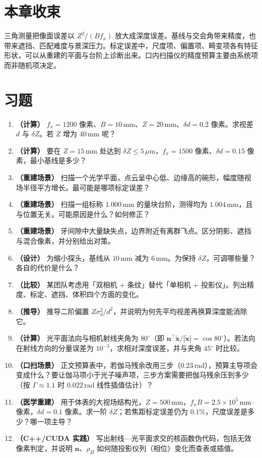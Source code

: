 \section*{本章收束}
三角测量把像面误差以 $Z^2/(Bf_x)$ 放大成深度误差。基线与交会角带来精度，也带来遮挡、匹配难度与景深压力。标定误差中，尺度项、偏置项、畸变项各有特征形状，可以从重建的平面与台阶上诊断出来。口内扫描仪的精度预算主要由系统项而非随机项决定。

\section{习题}
\label{sec:ch07-exercises}

\begin{enumerate}
  \item \textbf{（计算）} $f_x=1200$ 像素、$B=10\,\mathrm{mm}$、$Z=20\,\mathrm{mm}$、$\delta d=0.2$ 像素。求视差 $d$ 与 $\delta Z$。若 $Z$ 增为 $40\,\mathrm{mm}$ 呢？
  \item \textbf{（计算）} 要在 $Z=15\,\mathrm{mm}$ 处达到 $\delta Z\le5\,\mu\mathrm{m}$，$f_x=1500$ 像素、$\delta d=0.15$ 像素，最小基线是多少？
  \item \textbf{（重建场景）} 扫描一个光学平面，点云呈中心低、边缘高的碗形，幅度随视场半径平方增长。最可能是哪项标定误差？
  \item \textbf{（重建场景）} 扫描一组标称 $1.000\,\mathrm{mm}$ 的量块台阶，测得均为 $1.004\,\mathrm{mm}$，且与位置无关。可能原因是什么？如何修正？
  \item \textbf{（重建场景）} 牙间隙中大量缺失点，边界附近有离群飞点。区分阴影、遮挡与混合像素，并分别给出对策。
  \item \textbf{（设计）} 为缩小探头，基线从 $10\,\mathrm{mm}$ 减为 $6\,\mathrm{mm}$。为保持 $\delta Z$，可调哪些量？各自的代价是什么？
  \item \textbf{（比较）} 某团队考虑用「双相机 + 条纹」替代「单相机 + 投影仪」。列出精度、标定、遮挡、体积四个方面的变化。
  \item \textbf{（推导）} 推导二阶偏置 $Z\sigma_d^2/d^2$，并说明为何先平均视差再换算深度能消除它。
  \item \textbf{（计算）} 光平面法向与相机射线夹角为 $80^\circ$（即 $\boldsymbol n^\top\tilde{\boldsymbol x}/|\tilde{\boldsymbol x}|=\cos80^\circ$）。若法向在射线方向的分量误差为 $10^{-3}$，求相对深度误差，并与夹角 $45^\circ$ 时比较。
  \item \textbf{（口扫场景）} 正文预算表中，若伽马残余改用三步（$0.23\,\mathrm{rad}$），预算主导项会变成什么？要让伽马项小于光子噪声项，三步方案需要把伽马残余压到多少（按 $\Gamma\approx1.1$ 时 $0.022\,\mathrm{rad}$ 线性插值估计）？
  \item \textbf{（医学重建）} 用于体表的大视场结构光，$Z=500\,\mathrm{mm}$，$f_xB=2.5\times10^5\,\mathrm{mm}\cdot$像素，$\delta d=0.1$ 像素。求一阶 $\delta Z$；若焦距标定误差仍为 $0.1\%$，尺度误差是多少？哪一项主导？
  \item \textbf{（C++/CUDA 实践）} 写出射线—光平面求交的核函数伪代码，包括无效像素判定，并说明 $\boldsymbol n$、$\rho_\Pi$ 如何随投影仪列（相位）变化而查表或插值。
\end{enumerate}

